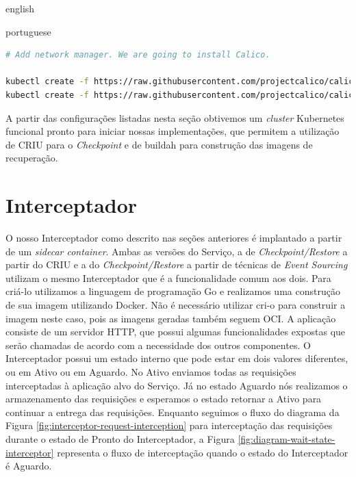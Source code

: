 \begin{otherlanguage*}{english}
\begin{otherlanguage*}{portuguese}
\begin{lstlisting}[language=bash,caption={Inicialização do Kubernetes, configuração de acesso para o kubectl e instalação do administrador de rede para Pods Calico.},label={listing:kubernetes-conf}]
# Add network manager. We are going to install Calico.

kubectl create -f https://raw.githubusercontent.com/projectcalico/calico/v3.26.1/manifests/tigera-operator.yaml
kubectl create -f https://raw.githubusercontent.com/projectcalico/calico/v3.26.1/manifests/custom-resources.yaml
\end{lstlisting}

A partir das configurações listadas nesta seção obtivemos um \textit{cluster} Kubernetes funcional
pronto para iniciar nossas implementações, que permitem a utilização de CRIU para o \textit{Checkpoint}
e de buildah para construção das imagens de recuperação.

\section{Interceptador}

O nosso Interceptador como descrito nas seções anteriores é implantado a partir de um
\textit{sidecar container}. Ambas as versões do Serviço, a de \textit{Checkpoint/Restore}
a partir do CRIU e a do \textit{Checkpoint/Restore} a partir de técnicas de
\textit{Event Sourcing} utilizam o mesmo Interceptador que é a funcionalidade comum aos
dois. Para criá-lo utilizamos a linguagem de programação Go e
realizamos uma construção de sua imagem utilizando Docker. Não é necessário utilizar
cri-o para construir a imagem neste caso, pois as imagens geradas também seguem OCI.
A aplicação consiste de um servidor HTTP, que possui algumas funcionalidades
expostas que serão chamadas de acordo com a necessidade dos outros componentes.
O Interceptador possui um estado interno que pode estar em dois valores diferentes,
ou em Ativo ou em Aguardo. No Ativo enviamos todas as requisições interceptadas à
aplicação alvo do Serviço. Já no estado Aguardo nós realizamos o armazenamento das
requisições e esperamos o estado retornar a Ativo para continuar a entrega das
requisições. Enquanto seguimos o fluxo do diagrama da Figura
\ref{fig:interceptor-request-interception} para interceptação das requisições durante
o estado de Pronto do Interceptador, a Figura \ref{fig:diagram-wait-state-interceptor}
representa o fluxo de interceptação quando o estado do Interceptador é Aguardo.


\end{otherlanguage*}
\end{otherlanguage*}

